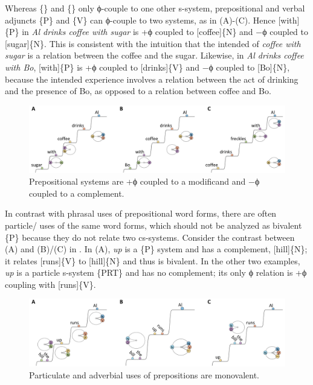   Whereas \{\} and \{\} only ϕ-couple to one other s-system, prepositional and verbal adjuncts \{P\} and \{V\} can ϕ-couple to two systems, as in {}(A)-(C). Hence [with]\{P\} in \textit{Al drinks coffee with sugar} is +ϕ coupled to [coffee]\{N\} and −ϕ coupled to [sugar]\{N\}. This is consistent with the intuition that the intended  of \textit{coffee with sugar} is a relation between the coffee and the sugar. Likewise, in \textit{Al drinks coffee with Bo}, [with]\{P\} is +ϕ coupled to [drinks]\{V\} and −ϕ coupled to [Bo]\{N\}, because the intended experience involves a relation between the act of drinking and the presence of Bo, as opposed to a relation between coffee and Bo.

  
\begin{figure}
\includegraphics[width=\textwidth]{figures/Tilsen-img84.png}
\caption{Prepositional systems are +ϕ coupled to a modificand and −ϕ coupled to a complement.}
\label{fig:4:34}
\end{figure}
 

  In contrast with phrasal uses of prepositional word forms, there are often particle/ uses of the same word forms, which should not be analyzed as bivalent \{P\} because they do not relate two cs-systems. Consider the contrast between (A) and (B)/(C) in {}. In (A), \textit{up} is a \{P\} system and has a complement, [hill]\{N\}; it relates [runs]\{V\} to [hill]\{N\} and thus is bivalent. In the other two examples, \textit{up} is a particle s-system \{PRT\} and has no complement; its only ϕ relation is +ϕ coupling with [runs]\{V\}.

  
\begin{figure}
\includegraphics[width=\textwidth]{figures/Tilsen-img85.png}
\caption{Particulate and adverbial uses of prepositions are monovalent.}
\label{fig:4:35}
\end{figure}
 


